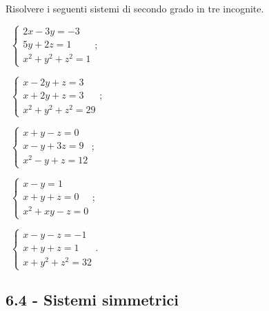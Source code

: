 \begin{esercizio}[\Ast]
 \label{ese:6.21}
Risolvere i seguenti sistemi di secondo grado in tre incognite.
\begin{multicols}{2}
 \begin{enumeratea}
 \item~$\left\{\begin{array}{l}2x-3y=-3\\5y+2z=1\\x^2+y^2+z^2=1\end{array}\right.$;
 \item~$\left\{\begin{array}{l}x-2y+z=3\\x+2y+z=3\\x^2+y^2+z^2=29\end{array}\right.$;
 \item~$\left\{\begin{array}{l}x+y-z=0\\x-y+3z=9\\x^2-y+z=12\end{array}\right.$;
 \item~$\left\{\begin{array}{l}x-y=1\\x+y+z=0\\x^2+xy-z=0\end{array}\right.$;
 \item~$\left\{\begin{array}{l}x-y-z=-1\\x+y+z=1\\x+y^2+z^2=32\end{array}\right.$.
 \end{enumeratea}
 \end{multicols}
\end{esercizio}

\subsection*{6.4 - Sistemi simmetrici}


